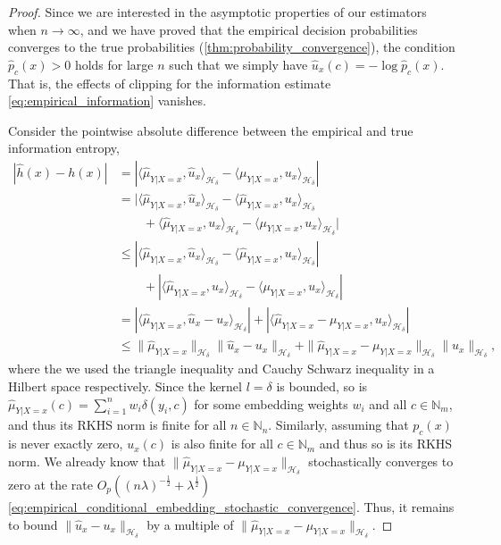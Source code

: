 \documentclass[runningheads, envcountsame, a4paper]{llncs}
\begin{document}
		\begin{proof}
			Since we are interested in the asymptotic properties of our estimators when $n \to \infty$, and we have proved that the empirical decision probabilities converges to the true probabilities (\cref{thm:probability_convergence}), the condition $\hat{p}_{c}(x) > 0$ holds for large $n$ such that we simply have $\hat{u}_{x}(c) = - \log{\hat{p}_{c}(x)}$. That is, the effects of clipping for the information estimate \eqref{eq:empirical_information} vanishes.
			
			Consider the pointwise absolute difference between the empirical and true information entropy,
			\begin{equation}
			\begin{aligned}
				| \hat{h}(x) - h(x) | &= | \langle \hat{\mu}_{Y | X = x}, \hat{u}_{x} \rangle_{\mathcal{H}_{\delta}} - \langle \mu_{Y | X = x}, u_{x} \rangle_{\mathcal{H}_{\delta}} | \\
				&= | \langle \hat{\mu}_{Y | X = x}, \hat{u}_{x} \rangle_{\mathcal{H}_{\delta}} - \langle \hat{\mu}_{Y | X = x}, u_{x} \rangle_{\mathcal{H}_{\delta}} \\
				& \qquad + \langle \hat{\mu}_{Y | X = x}, u_{x} \rangle_{\mathcal{H}_{\delta}} - \langle \mu_{Y | X = x}, u_{x} \rangle_{\mathcal{H}_{\delta}} | \\
				&\leq | \langle \hat{\mu}_{Y | X = x}, \hat{u}_{x} \rangle_{\mathcal{H}_{\delta}} - \langle \hat{\mu}_{Y | X = x}, u_{x} \rangle_{\mathcal{H}_{\delta}} | \\
				& \qquad + | \langle \hat{\mu}_{Y | X = x}, u_{x} \rangle_{\mathcal{H}_{\delta}} - \langle \mu_{Y | X = x}, u_{x} \rangle_{\mathcal{H}_{\delta}} | \\
				&= | \langle \hat{\mu}_{Y | X = x}, \hat{u}_{x} - u_{x} \rangle_{\mathcal{H}_{\delta}} | + | \langle \hat{\mu}_{Y | X = x} - \mu_{Y | X = x}, u_{x} \rangle_{\mathcal{H}_{\delta}} | \\
				&\leq \| \hat{\mu}_{Y | X = x} \|_{\mathcal{H}_{\delta}} \| \hat{u}_{x} - u_{x} \|_{\mathcal{H}_{\delta}} + \| \hat{\mu}_{Y | X = x} - \mu_{Y | X = x} \|_{\mathcal{H}_{\delta}} \| u_{x} \|_{\mathcal{H}_{\delta}},
			\label{eq:information_entropy_bound}
			\end{aligned}
			\end{equation}
			where the we used the triangle inequality and Cauchy Schwarz inequality in a Hilbert space respectively. Since the kernel $l = \delta$ is bounded, so is $\hat{\mu}_{Y | X = x}(c) = \sum_{i = 1}^{n} w_{i} \delta(y_{i}, c)$ for some embedding weights $w_{i}$ and all $c \in \mathbb{N}_{m}$, and thus its \gls{RKHS} norm is finite for all $n \in \mathbb{N}_{n}$. Similarly, assuming that $p_{c}(x)$ is never exactly zero, $u_{x}(c)$ is also finite for all $c \in \mathbb{N}_{m}$ and thus so is its \gls{RKHS} norm. We already know that $\| \hat{\mu}_{Y | X = x} - \mu_{Y | X = x} \|_{\mathcal{H}_{\delta}}$ stochastically converges to zero at the rate $O_{p}((n \lambda)^{-\frac{1}{2}} + \lambda^{\frac{1}{2}})$ \eqref{eq:empirical_conditional_embedding_stochastic_convergence}. Thus, it remains to bound $\| \hat{u}_{x} - u_{x} \|_{\mathcal{H}_{\delta}}$ by a multiple of $\| \hat{\mu}_{Y | X = x} - \mu_{Y | X = x} \|_{\mathcal{H}_{\delta}}$.
			

\end{proof}
\end{document}

